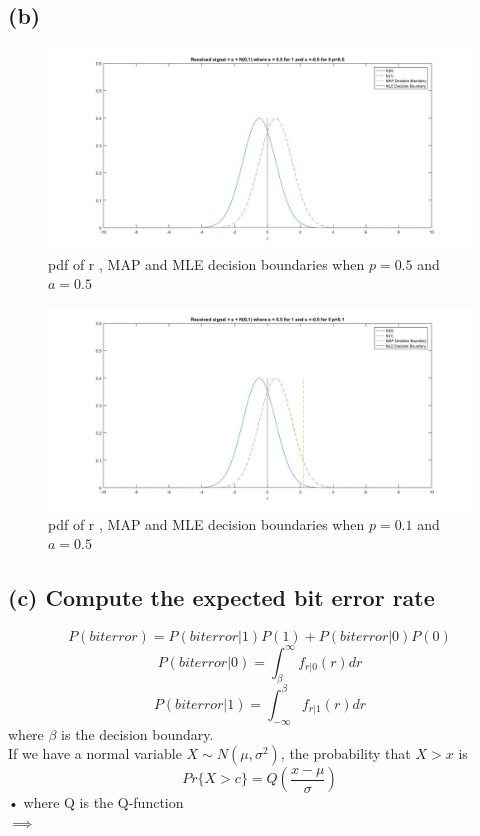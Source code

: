 \documentclass[a4paper,11pt]{article}
\begin{document}
\subsection*{(b)}
\begin{figure}[h]
   \hspace*{-5.5cm}
    \includegraphics[scale=0.5]{q2_b_1}
    \caption{pdf of r , MAP and MLE decision boundaries when $p=0.5$ and $a=0.5$}\label{fig:q2_b_1}
\end{figure}
\begin{figure}[h]
   \hspace*{-5.5cm}
    \includegraphics[scale=0.5]{q2_b_2}
    \caption{pdf of r , MAP and MLE decision boundaries when $p=0.1$ and $a=0.5$}\label{fig:q2_b_2}
\end{figure}
\clearpage
\newpage
\subsection*{(c) Compute the expected bit error rate}
$$P(biterror) = P(biterror|1)P(1)+P(biterror|0)P(0)$$
$$P(biterror|0) = \int_{\beta}^{\infty}f_{r|0}(r) dr$$
$$P(biterror|1) = \int_{-\infty}^{\beta}f_{r|1}(r) dr$$
where $\beta$ is the decision boundary.\\
If we have a normal variable $X\sim N(\mu,\sigma^2)$, the probability that $X>x$ is\\
\begin{equation}
Pr\{X>c\} = Q(\frac{x-\mu}{\sigma})
\end{equation}•
where Q is the Q-function\\
$\implies$
\end{document}
